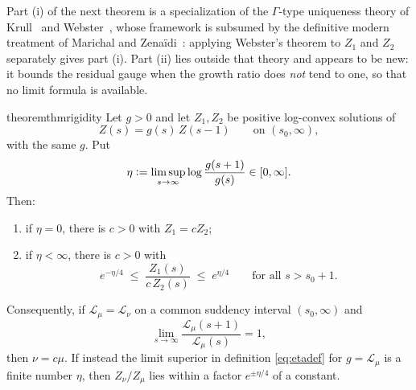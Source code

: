 \documentclass[sn-mathphys-num]{sn-jnl}
\theoremstyle{thmstyleone}%
\theoremstyle{thmstyletwo}%
\theoremstyle{thmstylethree}%
\theoremstyle{thmstyleone}%
\providecommand{\Leh}{\mathscr{L}}
\providecommand{\eqdef}{\mathrel{\vcentcolon=}}
\begin{document}
	Part (i) of the next theorem is a specialization of the
	$\Gamma$-type uniqueness theory of Krull~\cite{krull1948} and
	Webster~\cite{webster1997}, whose framework is subsumed by the
	definitive modern treatment of Marichal and
	Zena\"idi~\cite{marichal2022,marichal2024}: applying Webster's
	theorem to $Z_1$ and $Z_2$ separately gives part (i). Part (ii)
	lies outside that theory and appears to be new: it bounds the
	residual gauge when the growth ratio does \emph{not} tend to one,
	so that no limit formula is available.
	
	\begin{restatable}[Rigidity]{theorem}{thmrigidity}\label{thm:rigidity}
		Let $g>0$ and let $Z_1,Z_2$ be positive log-convex solutions of
		\begin{equation}\label{eq:funceq}
			Z(s)=g(s)\,Z(s-1)\qquad\text{on }(s_0,\infty),
		\end{equation}
		with the same $g$. Put
		\begin{equation}\label{eq:etadef}
			\eta\eqdef\limsup_{s\to\infty}
			\log\frac{g(s+1)}{g(s)}\in[0,\infty] .
		\end{equation}
		Then:
		\begin{enumerate}[label=\textup{(\roman*)},leftmargin=2.2em]
			\item if $\eta=0$, there is $c>0$ with $Z_1=cZ_2$;
			\item if $\eta<\infty$, there is $c>0$ with
			\begin{equation}\label{eq:quantgauge}
				e^{-\eta/4}\;\le\;\frac{Z_1(s)}{c\,Z_2(s)}\;\le\;e^{\eta/4}
				\qquad\text{for all }s>s_0+1 .
			\end{equation}
		\end{enumerate}
		Consequently, if $\Leh_\mu=\Leh_\nu$ on a common suddency interval
		$(s_0,\infty)$ and
		\begin{equation}\label{eq:ratiocond}
			\lim_{s\to\infty}\frac{\Leh_\mu(s+1)}{\Leh_\mu(s)}=1,
		\end{equation}
		then $\nu=c\mu$. If instead the limit
		superior in definition \eqref{eq:etadef} for $g=\Leh_\mu$ is a
		finite number $\eta$, then $Z_\nu/Z_\mu$ lies within a factor
		$e^{\pm\eta/4}$ of a constant.
	\end{restatable}
	
\end{document}
